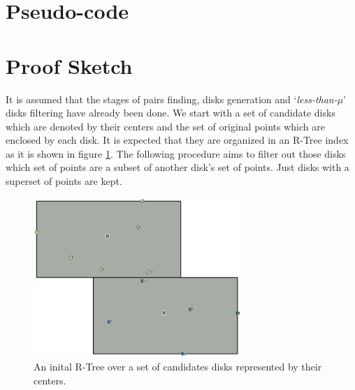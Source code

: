 \documentclass[12pt]{scrartcl}
\begin{document}
 
\section*{Pseudo-code}

\section*{Proof Sketch}
It is assumed that the stages of pairs finding, disks generation and `\textit{less-than-$\mu$}' disks filtering have already been done. We start with a set of candidate disks which are denoted by their centers and the set of original points which are enclosed by each disk.  It is expected that they are organized in an R-Tree index as it is shown in figure \ref{fig:r-tree}.  The following procedure aims to filter out those disks which set of points are a subset of another disk's set of points.  Just disks with a superset of points are kept.

\begin{figure}[t]
	\centering
	\begin{center}
	\includegraphics[width=0.7\textwidth]{./Figures/test}
\end{center}

	\caption{An inital R-Tree over a set of candidates disks represented by their centers.}
	\label{fig:r-tree}
\end{figure}
\end{document}

